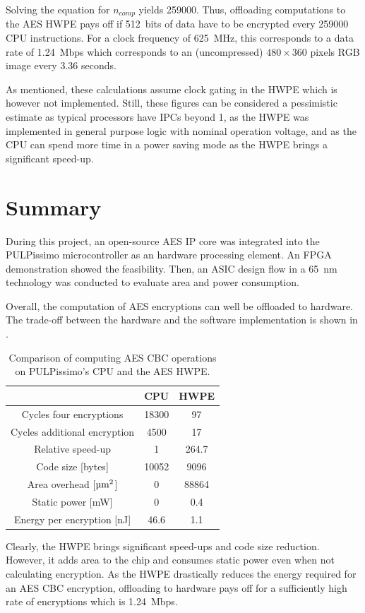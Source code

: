 \documentclass[a4paper, 12pt]{article}
\begin{document}
Solving the equation for $n_{comp}$ yields \num{259000}. Thus, offloading computations to the AES HWPE pays off if \SI{512}{bits} of data have to be encrypted every \num{259000} CPU instructions. For a clock frequency of \SI{625}{MHz}, this corresponds to a data rate of \SI{1.24}{Mbps} which corresponds to an (uncompressed) $480 \times 360$ pixels RGB image every $3.36$ seconds.

As mentioned, these calculations assume clock gating in the HWPE which is however not implemented. Still, these figures can be considered a pessimistic estimate as typical processors have IPCs beyond 1, as the HWPE was implemented in general purpose logic with nominal operation voltage, and as the CPU can spend more time in a power saving mode as the HWPE brings a significant speed-up.

\section{Summary} \label{sec:summary}

During this project, an open-source AES IP core was integrated into the PULPissimo microcontroller as an hardware processing element. An FPGA demonstration showed the feasibility. Then, an ASIC design flow in a \SI{65}{nm} technology was conducted to evaluate area and power consumption.

Overall, the computation of AES encryptions can well be offloaded to hardware. The trade-off between the hardware and the software implementation is shown in .

\begin{table}[h]
    \centering
    \begin{tabular}{c|c c}
        \toprule
        & CPU & HWPE \\
        \midrule
		Cycles four encryptions & 18300 & 97 \\
		Cycles additional encryption & 4500 & 17 \\
		Relative speed-up & 1  & 264.7 \\
		Code size [bytes] & 10052 & 9096 \\
		Area overhead [$\textrm{\micro m}^2$] & 0 & 88864 \\
		Static power [mW] & 0 & 0.4 \\
		Energy per encryption [nJ] & 46.6 & 1.1 \\
        \bottomrule
    \end{tabular}
	\caption{Comparison of computing AES CBC operations on PULPissimo's CPU and the AES HWPE.}
	\label{tab:conclusion}
\end{table}

Clearly, the HWPE brings significant speed-ups and code size reduction. However, it adds area to the chip and consumes static power even when not calculating encryption. As the HWPE drastically reduces the energy required for an AES CBC encryption, offloading to hardware pays off for a sufficiently high rate of encryptions which is \SI{1.24}{Mbps}.

\clearpage
\sloppy
\printbibliography
\end{document}
